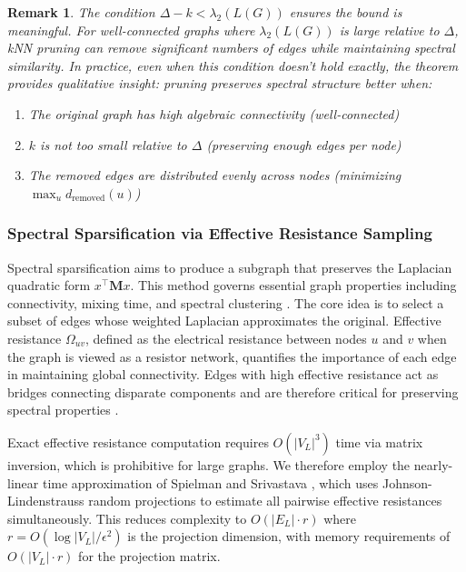 \documentclass[pdflatex,sn-mathphys-num]{sn-jnl}%
\theoremstyle{thmstyleone}%
\theoremstyle{thmstyletwo}%
\newtheorem{remark}{Remark}%
\theoremstyle{thmstylethree}%
\theoremstyle{plain} %
\theoremstyle{definition} %
\theoremstyle{remark} %
\theoremstyle{plain} %
\begin{document}
\begin{remark}
The condition $\Delta - k < \lambda_2(L(G))$ ensures the bound is meaningful. For well-connected graphs where $\lambda_2(L(G))$ is large relative to $\Delta$, kNN pruning can remove significant numbers of edges while maintaining spectral similarity. In practice, even when this condition doesn't hold exactly, the theorem provides qualitative insight: pruning preserves spectral structure better when:
\begin{enumerate}
    \item The original graph has high algebraic connectivity (well-connected)
    \item $k$ is not too small relative to $\Delta$ (preserving enough edges per node)
    \item The removed edges are distributed evenly across nodes (minimizing $\max_u d_{\text{removed}}(u)$)
\end{enumerate}
\end{remark}

\subsubsection{Spectral Sparsification via Effective Resistance Sampling}

Spectral sparsification aims to produce a subgraph that preserves the Laplacian quadratic form $x^\top \mathbf{M} x$.
This method governs essential graph properties including connectivity, mixing time, and spectral clustering \cite{spielman2011graph}.
The core idea is to select a subset of edges whose weighted Laplacian approximates the original. 
Effective resistance $\Omega_{uv}$, defined as the electrical resistance between nodes $u$ and $v$ when the graph is viewed as a resistor network, quantifies the importance of each edge in maintaining global connectivity. 
Edges with high effective resistance act as bridges connecting disparate components and are therefore critical for preserving spectral properties \cite{spielman2011graph}.



Exact effective resistance computation requires $O(|V_L|^3)$ time via matrix inversion, which is prohibitive for large graphs. We therefore employ the nearly-linear time approximation of Spielman and Srivastava \cite{spielman2011graph}, which uses Johnson-Lindenstrauss random projections to estimate all pairwise effective resistances simultaneously. This reduces complexity to $O(|E_L| \cdot r)$ where $r = O(\log |V_L|/\epsilon^2)$ is the projection dimension, with memory requirements of $O(|V_L| \cdot r)$ for the projection matrix.
\end{document}
